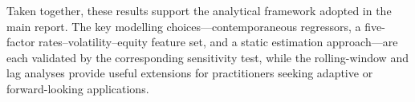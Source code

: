Taken together, these results support the analytical framework adopted in the
main report. The key modelling choices---contemporaneous regressors, a
five-factor rates--volatility--equity feature set, and a static estimation
approach---are each validated by the corresponding sensitivity test, while the
rolling-window and lag analyses provide useful extensions for practitioners
seeking adaptive or forward-looking applications.
